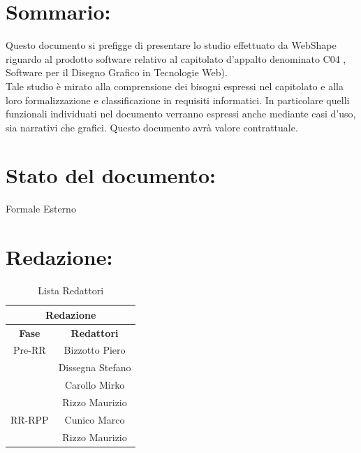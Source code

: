 \section*{\LARGE Sommario:} %
Questo documento si prefigge di presentare lo studio effettuato da WebShape riguardo al prodotto software relativo al capitolato d'appalto denominato C04 {\ajax}, Software per il Disegno Grafico in Tecnologie Web).\\
Tale studio \`e mirato alla comprensione dei bisogni espressi nel capitolato e alla loro formalizzazione e classificazione in requisiti informatici. In particolare quelli funzionali individuati nel documento verranno espressi anche mediante casi d'uso, sia narrativi che grafici. Questo documento avr\`a valore contrattuale.

\section*{\LARGE Stato del documento:}
	Formale Esterno
\hangindent=0pt

\section*{\LARGE Redazione:}
	\begin{table}[!h]
		\begin{center}
			\begin{tabular}
				{|c|c|}
				\hline
				\multicolumn{2}{|c|}{ \textbf{Redazione} } \\
				\hline
				\textbf{Fase} & \textbf{Redattori} \\
				\hline
				\multirow{1}{*}{Pre-RR} & Bizzotto Piero\\
										& Dissegna Stefano\\
										& Carollo Mirko\\
                                        & Rizzo Maurizio\\
				\hline
				\multirow{1}{*}{RR-RPP} & Cunico Marco\\
                                        & Rizzo Maurizio\\
				\hline
			\end{tabular}
			\caption{Lista Redattori} %
			\label{tabredazione}
		\end{center}
	\end{table}	

